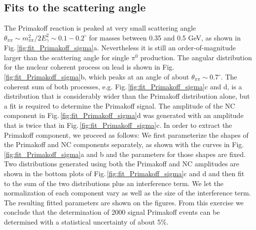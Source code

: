 \subsection{Fits to the scattering angle}
The Primakoff reaction is peaked at very small scattering angle $\theta_{\pi\pi} \sim m_{\pi\pi}^2 / 2E_\gamma^2 \sim 0.1-0.2^\circ$ for masses between 0.35 and 0.5 GeV, as shown in 
Fig.\,\ref{fig:fit_Primakoff_sigma}a.  Nevertheless it is still an
order-of-magnitude larger than the scattering angle for single $\pi^0$ production. The angular distribution for the nuclear coherent process on lead is shown in Fig.\,\ref{fig:fit_Primakoff_sigma}b, which 
peaks at an angle of about $\theta_{\pi\pi} \sim 0.7^\circ$. The coherent sum of both processes, e.g. Fig.\,\ref{fig:fit_Primakoff_sigma}c and d, is a distribution that is considerably wider than the 
Primakoff distribution alone, but a fit is required to determine the Primakoff signal. The amplitude of the NC component in Fig.\,\ref{fig:fit_Primakoff_sigma}d was generated with an amplitude that
is twice that in Fig.\,\ref{fig:fit_Primakoff_sigma}c.  In order to extract the Primakoff component, we proceed as follows: We first parameterize the shapes of the Primakoff and
NC components separately, as shown with the curves in Fig.\,\ref{fig:fit_Primakoff_sigma}a and b and the parameters for those shapes are fixed. Two distributions generated using both the Primakoff and
NC amplitudes are shown in the bottom plots of Fig.\,\ref{fig:fit_Primakoff_sigma}c and d and then fit to the sum of the two distributions plus an interference term. We let the normalization of each
component vary as well as the size of the interference term. The resulting fitted parameters are shown on the figures. From this exercise we conclude that the determination of 2000 signal Primakoff 
events can be determined with a statistical uncertainty of about 5\%.
   
